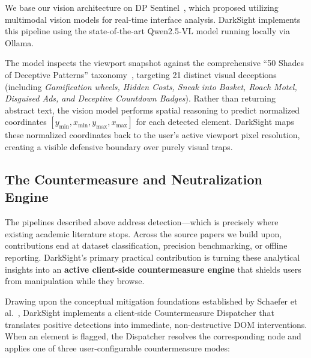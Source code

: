 \documentclass[11pt,a4paper]{article}
\begin{document}
We base our vision architecture on DP Sentinel~\cite{dpsentinel2024}, which proposed utilizing multimodal vision models for real-time interface analysis. DarkSight implements this pipeline using the state-of-the-art Qwen2.5-VL model running locally via Ollama.

The model inspects the viewport snapshot against the comprehensive ``50 Shades of Deceptive Patterns'' taxonomy~\cite{50shades}, targeting 21 distinct visual deceptions (including \textit{Gamification wheels, Hidden Costs, Sneak into Basket, Roach Motel, Disguised Ads, and Deceptive Countdown Badges}). Rather than returning abstract text, the vision model performs spatial reasoning to predict normalized coordinates $[y_{\min}, x_{\min}, y_{\max}, x_{\max}]$ for each detected element. DarkSight maps these normalized coordinates back to the user's active viewport pixel resolution, creating a visible defensive boundary over purely visual traps.

\subsection{The Countermeasure and Neutralization Engine}
\label{subsec:countermeasures}

The pipelines described above address detection—which is precisely where existing academic literature stops. Across the source papers we build upon, contributions end at dataset classification, precision benchmarking, or offline reporting. DarkSight's primary practical contribution is turning these analytical insights into an \textbf{active client-side countermeasure engine} that shields users from manipulation while they browse.

Drawing upon the conceptual mitigation foundations established by Schaefer et al.~\cite{schaefer2024}, DarkSight implements a client-side Countermeasure Dispatcher that translates positive detections into immediate, non-destructive DOM interventions. When an element is flagged, the Dispatcher resolves the corresponding node and applies one of three user-configurable countermeasure modes:
\end{document}
